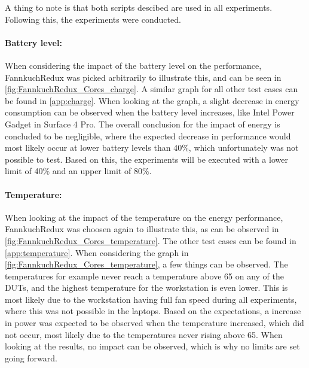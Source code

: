 A thing to note is that both scripts descibed are used in all experiments. Following this, the experiments were conducted.



\paragraph{Battery level:} When considering the impact of the battery level on the performance, FannkuchRedux was picked arbitrarily to illustrate this, and can be seen in \cref*{fig:FannkuchRedux_Cores_charge}. A similar graph for all other test cases can be found in \cref*{app:charge}. When looking at the graph, a slight decrease in energy consumption can be observed when the battery level increases, like Intel Power Gadget in Surface 4 Pro. The overall conclusion for the impact of energy is concluded to be negligible, where the expected decrease in performance would most likely occur at lower battery levels than 40\%, which unfortunately was not possible to test. Based on this, the experiments will be executed with a lower limit of 40\% and an upper limit of 80\%.




\paragraph{Temperature:} When looking at the impact of the temperature on the energy performance, FannkuchRedux was choosen again to illustrate this, as can be observed in \cref*{fig:FannkuchRedux_Cores_temperature}. The other test cases can be found in \cref*{app:temperature}. When considering the graph in \cref*{fig:FannkuchRedux_Cores_temperature}, a few things can be observed. The temperatures for example never reach a temperature above 65 on any of the DUTs, and the highest temperature for the workstation is even lower. This is most likely due to the workstation having full fan speed during all experiments, where this was not possible in the laptops. Based on the expectations, a increase in power was expected to be observed when the temperature increased, which did not occur, most likely due to the temperatures never rising above 65. When looking at the results, no impact can be observed, which is why no limits are set going forward.





